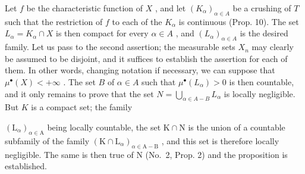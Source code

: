 Let \(f\) be the characteristic function of \(X\) , and let \((K_{\alpha})_{\alpha \in A}\) be a crushing of \(T\) such that the restriction of \(f\) to each of the \(K_{\alpha}\) is continuous (Prop. 10). The set \(L_{\alpha} = K_{\alpha} \cap X\) is then compact for every \(\alpha \in A\) , and \((L_{\alpha})_{\alpha \in A}\) is the desired family. Let us pass to the second assertion; the measurable sets \(X_{n}\) may clearly be assumed to be disjoint, and it suffices to establish the assertion for each of them. In other words, changing notation if necessary, we can suppose that \(\mu^{\bullet}(X) < +\infty\) . The set \(B\) of \(\alpha \in A\) such that \(\mu^{\bullet}(L_{\alpha}) > 0\) is then countable, and it only remains to prove that the set \(N = \bigcup_{\alpha \in A - B} L_{\alpha}\) is locally negligible. But \(K\) is a compact set; the family

\((\mathrm{L}_{\alpha})_{\alpha\in\mathrm{A}}\) being locally countable, the set \(\mathrm{K}\cap\mathrm{N}\) is the union of a countable subfamily of the family \((\mathrm{K}\cap\mathrm{L}_{\alpha})_{\alpha\in\mathrm{A}-\mathrm{B}}\) , and this set is therefore locally negligible. The same is then true of \(\mathrm{N}\) (No.~2, Prop. 2) and the proposition is established.

